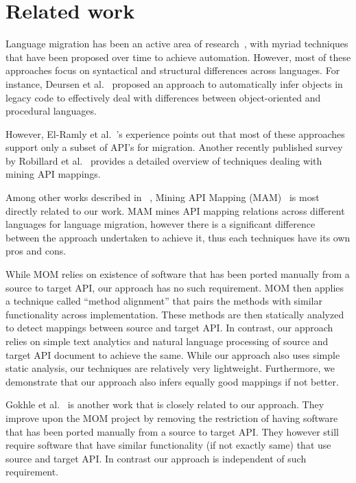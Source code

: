 \section{Related work}
\label{sec:related}

Language migration has been an active area of research~\cite{Hassan2005LAM, Mossienko2003ACJ, vanDeursen1999ICSE, WatersIEEEtranSE88}, with myriad techniques that have been proposed over time to achieve automation. However, most of these approaches focus on syntactical and structural differences across languages. For instance, Deursen et al.~\cite{vanDeursen1999ICSE} proposed an approach to automatically infer objects in legacy code to effectively deal with differences between object-oriented and procedural languages.

However, El-Ramly et al.~\cite{Ramly2006CSA}'s experience points out that most of these approaches support only a subset of API's for migration. Another recently published survey by Robillard et al.~\cite{RobillardIEEEtranSE13} provides a detailed overview of techniques dealing with mining API mappings.

Among other works described in ~\cite{RobillardIEEEtranSE13}, Mining API Mapping (MAM)~\cite{Zhong2010ICSE} is most directly related to our work. MAM mines API mapping relations across different languages for language migration, however there is a significant difference between the approach undertaken to achieve it, thus each techniques have its own pros and cons.

While MOM relies on existence of software that has been ported manually from a source to target API, our approach has no such requirement. MOM then applies a technique called ``method alignment'' that pairs the methods with similar functionality across implementation. These methods are then statically analyzed to detect mappings between source and target API. In contrast, our approach relies on simple text analytics and natural language processing of source and target API document to achieve the same. While our approach also uses simple static analysis, our techniques are relatively very lightweight. Furthermore, we demonstrate that our approach also infers equally good mappings if not better.

Gokhle et al.~\cite{Gokhale2013ICSE} is another work that is closely related to our approach. They improve upon the MOM project by removing the restriction of having software that has been ported manually from a source to target API. They however still require software that have similar functionality (if not exactly same) that use source and target API. In contrast our approach is independent of such requirement.

